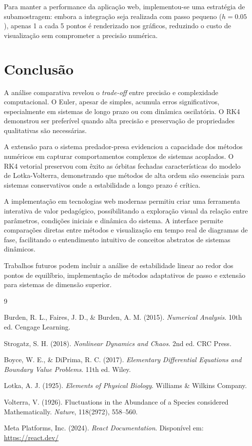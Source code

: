 \documentclass[11pt,a4paper]{article}
\begin{document}
Para manter a performance da aplicação web, implementou-se uma estratégia de subamostragem: embora a integração seja realizada com passo pequeno ($h = 0.05$), apenas 1 a cada 5 pontos é renderizado nos gráficos, reduzindo o custo de visualização sem comprometer a precisão numérica.

\section{Conclusão}

A análise comparativa revelou o \textit{trade-off} entre precisão e complexidade computacional. O Euler, apesar de simples, acumula erros significativos, especialmente em sistemas de longo prazo ou com dinâmica oscilatória. O RK4 demonstrou ser preferível quando alta precisão e preservação de propriedades qualitativas são necessárias.

A extensão para o sistema predador-presa evidenciou a capacidade dos métodos numéricos em capturar comportamentos complexos de sistemas acoplados. O RK4 vetorial preservou com êxito as órbitas fechadas características do modelo de Lotka-Volterra, demonstrando que métodos de alta ordem são essenciais para sistemas conservativos onde a estabilidade a longo prazo é crítica.

A implementação em tecnologias web modernas permitiu criar uma ferramenta interativa de valor pedagógico, possibilitando a exploração visual da relação entre parâmetros, condições iniciais e dinâmica do sistema. A interface permite comparações diretas entre métodos e visualização em tempo real de diagramas de fase, facilitando o entendimento intuitivo de conceitos abstratos de sistemas dinâmicos.

Trabalhos futuros podem incluir a análise de estabilidade linear ao redor dos pontos de equilíbrio, implementação de métodos adaptativos de passo e extensão para sistemas de dimensão superior.

\begin{thebibliography}{9}

Burden, R. L., Faires, J. D., \& Burden, A. M. (2015). \textit{Numerical Analysis}. 10th ed. Cengage Learning.

Strogatz, S. H. (2018). \textit{Nonlinear Dynamics and Chaos}. 2nd ed. CRC Press.

Boyce, W. E., \& DiPrima, R. C. (2017). \textit{Elementary Differential Equations and Boundary Value Problems}. 11th ed. Wiley.

Lotka, A. J. (1925). \textit{Elements of Physical Biology}. Williams \& Wilkins Company.

Volterra, V. (1926). Fluctuations in the Abundance of a Species considered Mathematically. \textit{Nature}, 118(2972), 558--560.

Meta Platforms, Inc. (2024). \textit{React Documentation}. Disponível em: \url{https://react.dev/}

\end{thebibliography}
\end{document}
